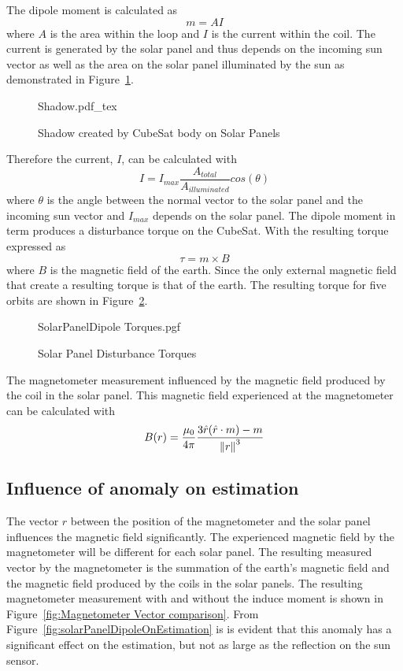 The dipole moment is calculated as
\begin{equation}
m = AI
\end{equation}
where $A$ is the area within the loop and $I$ is the current within the coil. The current is generated by the solar panel and thus depends on the incoming sun vector as well as the area on the solar panel illuminated by the sun as demonstrated in Figure~\ref{fig:Shadow}. 
\begin{figure}[!hbt]
	\centering
	\def\svgwidth{14cm}
	{Shadow.pdf_tex}
	\caption{Shadow created by CubeSat body on Solar Panels}
	\label{fig:Shadow}
\end{figure}
Therefore the current, $I$, can be calculated with
\begin{equation}
I = I_{max}\frac{A_{total}}{A_{illuminated}}cos(\theta)
\end{equation}
where $\theta$ is the angle between the normal vector to the solar panel and the incoming sun vector and $I_{max}$ depends on the solar panel. The dipole moment in term produces a disturbance torque on the CubeSat. With the resulting torque expressed as
\begin{equation}
\tau = m \times B
\end{equation}
where $B$ is the magnetic field of the earth. Since the only external magnetic field that create a resulting torque is that of the earth. The resulting torque for five orbits are shown in Figure~\ref{fig:solarPanel Disturbance Torques}.
\begin{figure}[!htb]
	\centering
	
	{SolarPanelDipole Torques.pgf}
	
	\caption{Solar Panel Disturbance Torques}
	\label{fig:solarPanel Disturbance Torques}
\end{figure}

The magnetometer measurement influenced by the magnetic field produced by the coil in the solar panel. This magnetic field experienced at the magnetometer can be calculated with 
\begin{equation}
B(r) = \frac{\mu_0}{4\pi} \frac{3 \hat{r} (\hat{r} \cdot m) - m}{\left\lVert r\right\rVert^3}
\end{equation}

\subsection{Influence of anomaly on estimation}
The vector $r$ between the position of the magnetometer and the solar panel influences the magnetic field significantly. The experienced magnetic field  by the magnetometer will be different for each solar panel. The resulting measured vector by the magnetometer is the summation of the earth's magnetic field and the magnetic field produced by the coils in the solar panels. The resulting magnetometer measurement with and without the induce moment is shown in Figure~\ref{fig:Magnetometer Vector comparison}. From Figure~\ref{fig:solarPanelDipoleOnEstimation} is is evident that this anomaly has a significant effect on the estimation, but not as large as the reflection on the sun sensor. 


